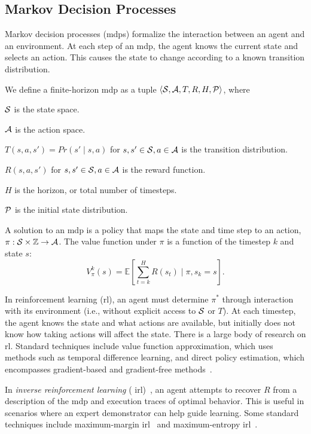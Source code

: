 \subsection{Markov Decision Processes}
Markov decision processes ({\sc mdp}s) formalize the interaction
between an agent and an environment. At each step of an {\sc mdp}, the
agent knows the current state and selects an action. This causes the
state to change according to a known transition distribution.
\begin{defn}
We define a finite-horizon {\sc mdp} as a tuple $\langle \mathcal{S}, \mathcal{A}, T,
R, H, \mathcal{P} \rangle$, where
\begin{tightlist}
\item $\mathcal{S}$ is the state space.
\item $\mathcal{A}$ is the action space.
\item $T(s, a, s') = Pr(s' \mid s, a)$ for $s, s' \in \mathcal{S}, a \in \mathcal{A}$ is the transition distribution.
\item $R(s, a, s')$ for $s, s' \in \mathcal{S}, a \in \mathcal{A}$ is the reward function.
\item $H$ is the horizon, or total number of timesteps.
\item $\mathcal{P}$ is the initial state distribution.
\end{tightlist}
\end{defn}
A solution to an {\sc mdp} is a policy that maps the state and time
step to an action, $\pi: \mathcal{S} \times \mathbb{Z} \rightarrow \mathcal{A}$.  The
value function under $\pi$ is a function of the timestep $k$ and state
$s$:
$$V_{\pi}^{k}(s) = \mathbb{E}\left[\sum_{t=k}^{H}R(s_{t}) \mid \pi, s_{k} = s\right].$$

In reinforcement learning ({\sc rl}), an agent must determine
$\pi^{*}$ through interaction with its environment (i.e., without
explicit access to $\mathcal{S}$ or $T$). At each timestep, the agent knows
the state and what actions are available, but initially does not know
how taking actions will affect the state. There is a large body of
research on {\sc rl}. Standard techniques include value function
approximation, which uses methods such as temporal difference
learning, and direct policy estimation, which encompasses
gradient-based and gradient-free methods~\cite{suttonbarto}.

In \emph{inverse reinforcement learning} ({\sc
  irl})~\cite{ng2000algorithms}, an agent attempts to recover $R$ from
a description of the {\sc mdp} and execution traces of optimal
behavior. This is useful in scenarios where an expert demonstrator can
help guide learning.  Some standard techniques include maximum-margin
{\sc irl}~\cite{abbeel2004apprenticeship} and maximum-entropy {\sc
  irl}~\cite{maxentirl}.
